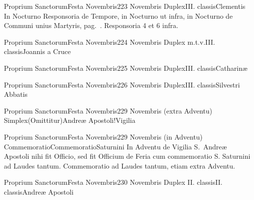 \documentclass[liber-responsorialis.tex]{subfiles}
\begin{document}
	{Proprium Sanctorum}{Festa Novembris}{2}{23 Novembris}
	{Duplex}{III. classis}{Clementis}
	{In  Nocturno Responsoria de Tempore, in  Nocturno ut infra, in  Nocturno de Communi unius Martyris, pag.\ \pageref{M-UMEX}.}
	{Responsoria 4 et 6 infra.}

	{Proprium Sanctorum}{Festa Novembris}{2}{24 Novembris}
	{Duplex m.t.v.}{III. classis}{Joannis a Cruce}
	{\conprubric}
	{\respdetemp}

	{Proprium Sanctorum}{Festa Novembris}{2}{25 Novembris}
	{Duplex}{III. classis}{Catharinæ}
	{\vmrubric}
	{\respdetemp}

	{Proprium Sanctorum}{Festa Novembris}{2}{26 Novembris}
	{Duplex}{III. classis}{Silvestri Abbatis}
	{\conprubric}
	{\respdetemp}

	{Proprium Sanctorum}{Festa Novembris}{2}{29 Novembris (extra Adventu)}
	{Simplex}{(Omittitur)}{Andreæ Apostoli!Vigilia}
	{}
	{}
\rubric{\respdetemp}

	{Proprium Sanctorum}{Festa Novembris}{2}{29 Novembris (in Adventu)}
	{Commemoratio}{Commemoratio}{Saturnini}
	{In Adventu de Vigilia S.\ Andreæ Apostoli nihi fit Officio, sed fit Officium de Feria cum commemoratio S. Saturnini ad Laudes tantum.}
	{Commemoratio ad Laudes tantum, etiam extra Adventu.}
\rubric{\respdetemp}

	{Proprium Sanctorum}{Festa Novembris}{2}{30 Novembris}
	{Duplex II. classis}{II. classis}{Andreæ Apostoli}
	{}
	{}
\end{document}
